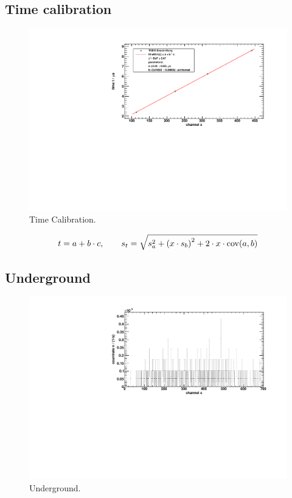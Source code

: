 \subsection{Time calibration}
\begin{figure}[H]
\begin{center}
  \includegraphics[width=\textwidth]{../img/timeCalibration.pdf}
  \caption{Time Calibration.}
  \label{img:timecalibration}
\end{center}
\end{figure}

\begin{equation}
\label{eq:tcalibration}
    t = a + b \cdot c, \qquad s_t = \sqrt{s_a^2 + \left(x \cdot s_b \right)^2 + 2 \cdot x \cdot \operatorname{cov}(a,b)}
\end{equation}

\subsection{Underground}
\begin{figure}[H]
\begin{center}
  \includegraphics[width=\textwidth]{../img/underground.pdf}
  \caption{Underground.}
  \label{img:underground}
\end{center}
\end{figure}

